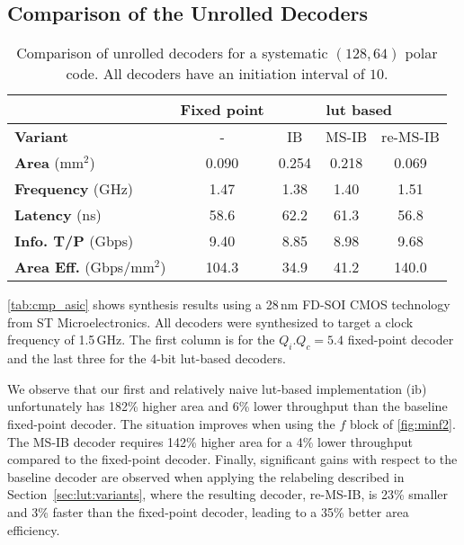 \documentclass[conference,letterpaper]{IEEEtran}
\begin{document}
\subsection{Comparison of the Unrolled Decoders}\label{sec:impl:cmp}
\begin{table}
  \centering
  \caption{Comparison of unrolled decoders for a systematic $(128,64)$ polar code. All decoders have an initiation interval of $10$.}
  \begin{tabular}{l c ccc}
    \toprule
                 & \bf Fixed point& \multicolumn{3}{c}{\bf \gls{lut} based} \\
    \midrule
    \textbf{Variant}      & - & IB & MS-IB & re-MS-IB \\
    \textbf{Area} (mm$^2$)&          0.090 & 0.254 & 0.218 & 0.069 \\ 
    \textbf{Frequency} (GHz)&        1.47 &  1.38 &  1.40 & 1.51 \\
    \textbf{Latency} (ns)&           58.6 &  62.2 &  61.3 & 56.8 \\ 
    \textbf{Info. T/P} (Gbps)&       9.40 &  8.85 &  8.98 & 9.68 \\ 
    \textbf{Area Eff.} (Gbps/mm$^2$)& 104.3 & 34.9 &  41.2 & 140.0 \\ 
    \bottomrule
  \end{tabular}
  \label{tab:cmp_asic}
\end{table}

\autoref{tab:cmp_asic} shows synthesis results using a 28\,nm FD-SOI CMOS technology from ST Microelectronics. All decoders were synthesized to target a clock frequency of 1.5\,GHz. The first column is for the $Q_i$.$Q_c=5.4$ fixed-point decoder and the last three for the 4-bit \gls{lut}-based decoders. 

We observe that our first and relatively naive \gls{lut}-based implementation (\gls{ib}) unfortunately has 182\% higher area and 6\% lower throughput than the baseline fixed-point decoder. The situation improves when using the $f$ block of \autoref{fig:minf2}. The MS-IB decoder requires 142\% higher area for a 4\% lower throughput compared to the fixed-point decoder. Finally, significant gains with respect to the baseline decoder are observed when applying the relabeling described in Section~\ref{sec:lut:variants}, where the resulting decoder, re-MS-IB, is 23\% smaller and 3\% faster than the fixed-point decoder, leading to a 35\% better area efficiency.
\end{document}
